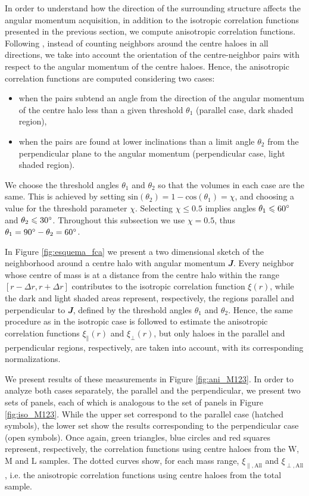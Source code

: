 \documentclass[fleqn,usenatbib]{mnras}
\newcommand{\Wh}{\mathrm{W}}
\newcommand{\Lh}{\mathrm{L}}
\newcommand{\Mh}{\mathrm{M}}
\begin{document}
In order to understand how the direction of the surrounding structure affects the angular momentum acquisition, in addition to the {isotropic} correlation functions presented in the previous section, we compute {anisotropic} correlation functions. Following \citet{pazetal2008}, instead of counting neighbors around the centre haloes in all directions, we take into account the orientation of the {centre-neighbor} pairs with respect to the angular momentum of the centre haloes. Hence, the anisotropic correlation functions are computed considering two cases:
\begin{itemize}
\item when the pairs subtend an angle from the direction of the  angular momentum of the centre halo less than a given threshold $\theta_1$ ({parallel case}, dark shaded region), 
\item when the pairs are found at lower inclinations than a limit angle $\theta_2$ from the perpendicular plane to the angular momentum ({perpendicular case}, light shaded region).
\end{itemize}
We choose the threshold angles $\theta_1$ and $\theta_2$ so that the volumes in each case are the same. This is achieved by setting $\mathrm{sin}(\theta_2) = 1-\mathrm{cos}(\theta_1) = \chi$, and choosing a value for the threshold parameter $\chi$. Selecting $\chi \leq 0.5$ implies angles $\theta_1 \leqslant 60\hbox{$^\circ$}$ and $\theta_2 \leqslant 30\hbox{$^\circ$}$. Throughout this subsection we use $\chi = 0.5$, thus $\theta_1=90\hbox{$^\circ$}-\theta_2=60\hbox{$^\circ$}$.

In Figure \ref{fig:esquema_fca} we present a two dimensional sketch of the neighborhood around a centre halo with angular momentum $\mathbfit{J}$. Every neighbor whose centre of mass is at a distance from the centre halo within the range $[r-\Delta r,r+\Delta r]$ contributes to the isotropic correlation function $\xi(r)$, while the dark and light shaded areas represent, respectively, the regions {parallel} and {perpendicular} to $\mathbfit{J}$, defined by the threshold angles $\theta_1$ and $\theta_2$. Hence, the same procedure as in the isotropic case is followed to estimate the anisotropic correlation functions $\xi_{\parallel}(r)$ and $\xi_{\perp}(r)$, but only haloes in the parallel and perpendicular regions, respectively, are taken into account, with its corresponding normalizations.

We present results of these measurements in Figure \ref{fig:ani_M123}. In order to analyze both cases separately, the parallel and the perpendicular, we present two sets of panels, each of which is analogous to the set of panels in Figure \ref{fig:iso_M123}. While the upper set correspond to the parallel case (hatched symbols), the lower set show the results corresponding to the perpendicular case (open symbols). Once again, green triangles, blue circles and red squares represent, respectively, the correlation functions using centre haloes from the $\Wh$, $\Mh$ and $\Lh$ samples. The dotted curves show, for each mass range, $\xi_\mathrm{\parallel,All}$ and $\xi_\mathrm{\perp,All}$, i.e. the anisotropic correlation functions using centre haloes from the total sample. 
\end{document}
